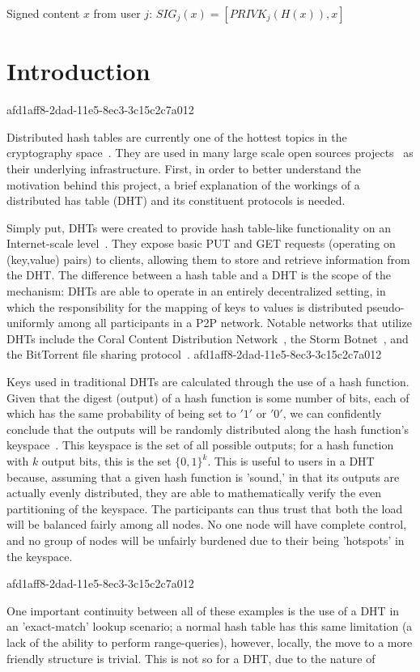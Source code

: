 \documentclass[12pt]{article}
\begin{document}
Signed content $x$ from user $j$: $SIG_j(x) = \left[ PRIVK_j( H(x) ), x \right]$

\section{Introduction}
afd1aff8-2dad-11e5-8ec3-3c15c2c7a012\par Distributed hash tables are currently one of the hottest topics in the cryptography space~\cite{Stoica:2001dj,Rowstron:2001ea,Ratnasamy:2001wn}. They are used in many large scale open sources projects~\cite{Freitas:2013tb,Xu:2010vs,Perfitt:2010fh} as their underlying infrastructure. First, in order to better understand the motivation behind this project, a brief explanation of the workings of a distributed has table (DHT) and its constituent protocols is needed.

\par Simply put, DHTs were created to provide hash table-like functionality on an Internet-scale level~\cite{Ratnasamy:2001wn}. They expose basic PUT and GET requests (operating on (key,value) pairs) to clients, allowing them to store and retrieve information from the DHT. The difference between a hash table and a DHT is the scope of the mechanism: DHTs are able to operate in an entirely decentralized setting, in which the responsibility for the mapping of keys to values is distributed pseudo-uniformly among all participants in a P2P network. Notable networks that utilize DHTs include the Coral Content Distribution Network~\cite{Freedman:2004vb}, the Storm Botnet~\cite{Holz:2008uk}, and the BitTorrent file sharing protocol~\cite{Cohen:y1_8mBnw}.
afd1aff8-2dad-11e5-8ec3-3c15c2c7a012
\par Keys used in traditional DHTs are calculated through the use of a hash function. Given that the digest (output) of a hash function is some number of bits, each of which has the same probability of being set to $'1'$ or $'0'$, we can confidently conclude that the outputs will be randomly distributed along the hash function's keyspace~. This keyspace is the set of all possible outputs; for a hash function with $k$ output bits, this is the set $\{0,1\}^k$. This is useful to users in a DHT because, assuming that a given hash function is 'sound,' in that its outputs are actually evenly distributed, they are able to mathematically verify the even partitioning of the keyspace. The participants can thus trust that both the load will be balanced fairly among all nodes. No one node will have complete control, and no group of nodes will be unfairly burdened due to their being 'hotspots' in the keyspace.~

afd1aff8-2dad-11e5-8ec3-3c15c2c7a012\par One important continuity between all of these examples is the use of a DHT in an 'exact-match' lookup scenario; a normal hash table has this same limitation (a lack of the ability to perform range-queries), however, locally, the move to a more friendly structure is trivial. This is not so for a DHT, due to the nature of
\printbibliography
\end{document}
